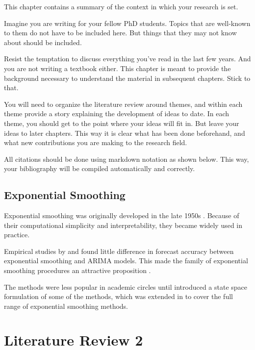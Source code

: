 \documentclass{sydneythesis}
\begin{document}
This chapter contains a summary of the context in which your research is set.

Imagine you are writing for your fellow PhD students. Topics that are well-known to them do not have to be included here. But things that they may not know about should be included.

Resist the temptation to discuss everything you've read in the last few years. And you are not writing a textbook either. This chapter is meant to provide the background necessary to understand the material in subsequent chapters. Stick to that.

You will need to organize the literature review around themes, and within each theme provide a story explaining the development of ideas to date. In each theme, you should get to the point where your ideas will fit in. But leave your ideas to later chapters. This way it is clear what has been done beforehand, and what new contributions you are making to the research field.

All citations should be done using markdown notation as shown below. This way, your bibliography will be compiled automatically and correctly.

\hypertarget{sec:expsmooth}{%
\section{Exponential Smoothing}\label{sec:expsmooth}}

Exponential smoothing was originally developed in the late 1950s \autocite{Brown59,Brown63,Holt57,Winters60}. Because of their computational simplicity and interpretability, they became widely used in practice.

Empirical studies by \textcite{MH79} and \textcite{Metal82} found little difference in forecast accuracy between exponential smoothing and ARIMA models. This made the family of exponential smoothing procedures an attractive proposition \autocite[see][]{CKOS01}.

The methods were less popular in academic circles until \textcite{OKS97} introduced a state space formulation of some of the methods, which was extended in \textcite{HKSG02} to cover the full range of exponential smoothing methods.

\hypertarget{ch:litreview2}{%
\chapter{Literature Review 2}\label{ch:litreview2}}
\end{document}
